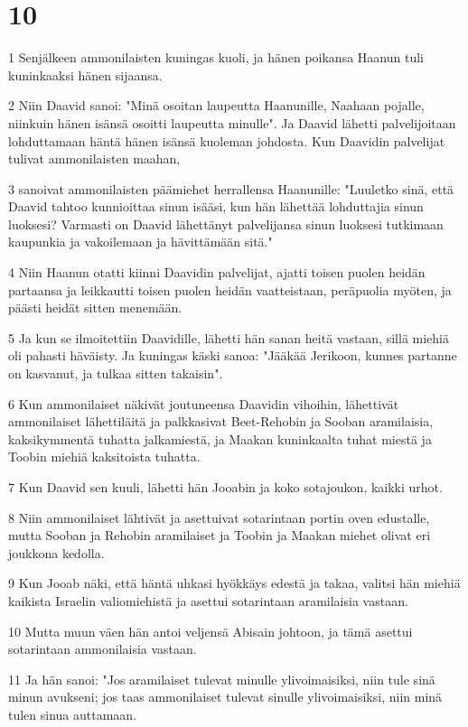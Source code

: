 \chapter{10}

\par 1 Senjälkeen ammonilaisten kuningas kuoli, ja hänen poikansa Haanun tuli kuninkaaksi hänen sijaansa.
\par 2 Niin Daavid sanoi: "Minä osoitan laupeutta Haanunille, Naahaan pojalle, niinkuin hänen isänsä osoitti laupeutta minulle". Ja Daavid lähetti palvelijoitaan lohduttamaan häntä hänen isänsä kuoleman johdosta. Kun Daavidin palvelijat tulivat ammonilaisten maahan,
\par 3 sanoivat ammonilaisten päämiehet herrallensa Haanunille: "Luuletko sinä, että Daavid tahtoo kunnioittaa sinun isääsi, kun hän lähettää lohduttajia sinun luoksesi? Varmasti on Daavid lähettänyt palvelijansa sinun luoksesi tutkimaan kaupunkia ja vakoilemaan ja hävittämään sitä."
\par 4 Niin Haanun otatti kiinni Daavidin palvelijat, ajatti toisen puolen heidän partaansa ja leikkautti toisen puolen heidän vaatteistaan, peräpuolia myöten, ja päästi heidät sitten menemään.
\par 5 Ja kun se ilmoitettiin Daavidille, lähetti hän sanan heitä vastaan, sillä miehiä oli pahasti häväisty. Ja kuningas käski sanoa: "Jääkää Jerikoon, kunnes partanne on kasvanut, ja tulkaa sitten takaisin".
\par 6 Kun ammonilaiset näkivät joutuneensa Daavidin vihoihin, lähettivät ammonilaiset lähettiläitä ja palkkasivat Beet-Rehobin ja Sooban aramilaisia, kaksikymmentä tuhatta jalkamiestä, ja Maakan kuninkaalta tuhat miestä ja Toobin miehiä kaksitoista tuhatta.
\par 7 Kun Daavid sen kuuli, lähetti hän Jooabin ja koko sotajoukon, kaikki urhot.
\par 8 Niin ammonilaiset lähtivät ja asettuivat sotarintaan portin oven edustalle, mutta Sooban ja Rehobin aramilaiset ja Toobin ja Maakan miehet olivat eri joukkona kedolla.
\par 9 Kun Jooab näki, että häntä uhkasi hyökkäys edestä ja takaa, valitsi hän miehiä kaikista Israelin valiomiehistä ja asettui sotarintaan aramilaisia vastaan.
\par 10 Mutta muun väen hän antoi veljensä Abisain johtoon, ja tämä asettui sotarintaan ammonilaisia vastaan.
\par 11 Ja hän sanoi: "Jos aramilaiset tulevat minulle ylivoimaisiksi, niin tule sinä minun avukseni; jos taas ammonilaiset tulevat sinulle ylivoimaisiksi, niin minä tulen sinua auttamaan.
